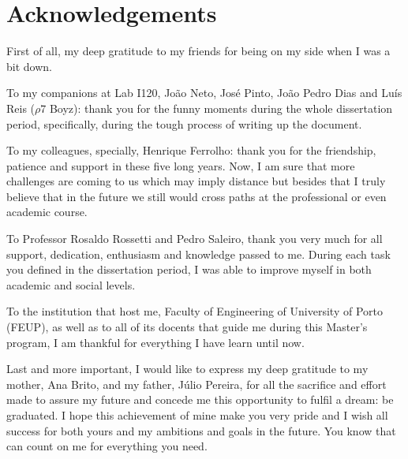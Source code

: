 \chapter*{Acknowledgements}

First of all, my deep gratitude to my friends for being on my side when I was a bit down.

\medskip

To my companions at Lab I120, João Neto, José Pinto, João Pedro Dias and Luís Reis ($\rho$7 Boyz): thank you for the funny moments during the whole dissertation period, specifically, during the tough process of writing up the document.

\medskip

To my colleagues, specially, Henrique Ferrolho: thank you for the friendship, patience and support in these five long years. Now, I am sure that more challenges are coming to us which may imply distance but besides that I truly believe that in the future we still would cross paths at the professional or even academic course.

\medskip

To Professor Rosaldo Rossetti and Pedro Saleiro, thank you very much for all support, dedication, enthusiasm and knowledge passed to me. During each task you defined in the dissertation period, I was able to improve myself in both academic and social levels.

\medskip

To the institution that host me, Faculty of Engineering of University of Porto (FEUP), as well as to all of its docents that guide me during this Master's program, I am thankful for everything I have learn until now.

\medskip

Last and more important, I would like to express my deep gratitude to my mother, Ana Brito, and my father, Júlio Pereira, for all the sacrifice and effort made to assure my future and concede me this opportunity to fulfil a dream: be graduated. I hope this achievement of mine make you very pride and I wish all success for both yours and my ambitions and goals in the future. You know that can count on me for everything you need.

\vspace{10mm}
